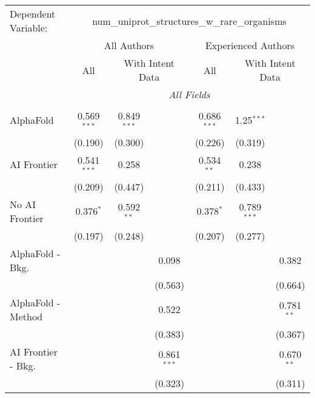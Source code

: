 \begingroup
\centering
\begin{tabular}{lcccccc}
   \tabularnewline \midrule \midrule
   Dependent Variable: & \multicolumn{6}{c}{num\_uniprot\_structures\_w\_rare\_organisms}\\
 & \multicolumn{3}{c}{All Authors} & \multicolumn{3}{c}{Experienced Authors} \\
\cmidrule(lr){2-4} \cmidrule(lr){5-7}
 & \multicolumn{1}{c}{All} & \multicolumn{2}{c}{With Intent Data} & \multicolumn{1}{c}{All} & \multicolumn{2}{c}{With Intent Data} \\
\cmidrule(lr){2-2} \cmidrule(lr){3-4} \cmidrule(lr){5-5} \cmidrule(lr){6-7}
 & \multicolumn{6}{c}{\textit{All Fields}} \\ \\
   AlphaFold               & 0.569$^{***}$ & 0.849$^{***}$ &               & 0.686$^{***}$ & 1.25$^{***}$  &   \\   
                           & (0.190)       & (0.300)       &               & (0.226)       & (0.319)       &   \\   
   AI Frontier             & 0.541$^{***}$ & 0.258         &               & 0.534$^{**}$  & 0.238         &   \\   
                           & (0.209)       & (0.447)       &               & (0.211)       & (0.433)       &   \\   
   No AI Frontier          & 0.376$^{*}$   & 0.592$^{**}$  &               & 0.378$^{*}$   & 0.789$^{***}$ &   \\   
                           & (0.197)       & (0.248)       &               & (0.207)       & (0.277)       &   \\   
   AlphaFold - Bkg.        &               &               & 0.098         &               &               & 0.382\\   
                           &               &               & (0.563)       &               &               & (0.664)\\   
   AlphaFold - Method      &               &               & 0.522         &               &               & 0.781$^{**}$\\   
                           &               &               & (0.383)       &               &               & (0.367)\\   
   AI Frontier - Bkg.      &               &               & 0.861$^{***}$ &               &               & 0.670$^{**}$\\   
                           &               &               & (0.323)       &               &               & (0.311)\\   

\end{tabular}
